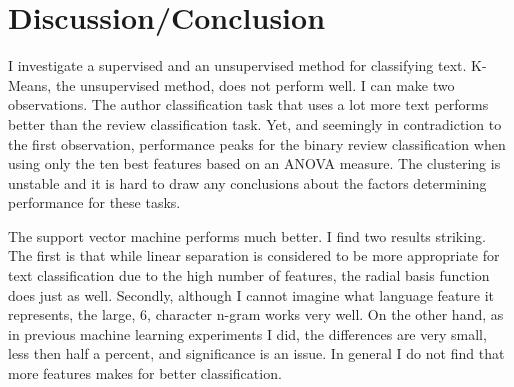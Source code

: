 \documentclass[11pt]{article}
\begin{document}
\section{Discussion/Conclusion}

I investigate a supervised and an unsupervised method for classifying text. K-Means, the unsupervised method, does not perform well. I can make two observations. The author classification task that uses a lot more text performs better than the review classification task. Yet, and seemingly in contradiction to the first observation, performance peaks for the binary review classification when using only the ten best features based on an ANOVA measure. The clustering is unstable and it is hard to draw any conclusions about the factors determining performance for these tasks.

The support vector machine performs much better. I find two results striking. The first is that while linear separation is considered to be more appropriate for text classification due to the high number of features, the radial basis function does just as well. Secondly, although I cannot imagine what language feature it represents, the large, 6, character n-gram works very well. On the other hand, as in previous machine learning experiments I did, the differences are very small, less then half a percent, and significance is an issue. In general I do not find that more features makes for better classification.



\end{document}
